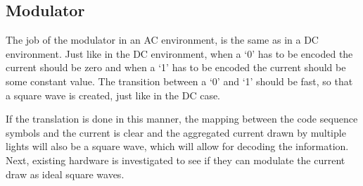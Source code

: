 

\subsection{Modulator}	
\label{subsec:ac-modulator}

The job of the modulator in an AC environment, is the same as in a DC environment.
Just like in the DC environment, when a `0' has to be encoded the current should be zero and when a `1' has to be encoded the current should be some constant value.
The transition between a `0' and `1' should be fast, so that a square wave is created, just like in the DC case.

If the translation is done in this manner, the mapping between the code sequence symbols and the current is clear and the aggregated current drawn by multiple lights will also be a square wave, which will allow for decoding the information.
Next, existing hardware is investigated to see if they can modulate the current draw as ideal square waves.








